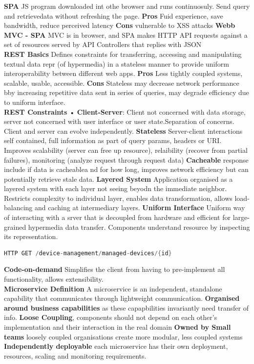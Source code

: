 \documentclass[10pt, landscape]{article}
\begin{document}
\begin{multicols}{4}
\textbf{SPA} JS program downloaded int othe browser and runs continuosuly. Send query and retrievedata without refreshing the page. \textbf{Pros} Fuid experience, save bandwidth, reduce perceived latency 
\textbf{Cons} vulnerable to XSS attacks \textbf{Webb MVC - SPA} MVC is in browser, and SPA makes HTTP API requests against a set of resources served by API Controllers that replies with JSON\\

\textbf{REST Basics} 
Defines constraints for transferring, accessing and manipulating textual data repr (of hypermedia) in a stateless manner to provide uniform interoperability between different web apps. \textbf{Pros} Less tightly coupled systems, scalable, usable, accessible. \textbf{Cons} Stateless may decrease network performance bby increasing repetitive data sent in series of queries, may degrade efficiency due to uniform interface.\\ 
\textbf{REST Constraints} 
• \textbf{Client-Server}: Client not concerned with data storage, server not concerned with user interface or user state.Separation of concerns. Client and server can evolve independently. 
\textbf{Stateless} 
Server-client interactions self contained, full information as part of query params, headers or URI. Improves scalability (server can free up resource), relaibility (recover from partial failures), monitoring (analyze request through request data)
\textbf{Cacheable}
response include if data is cacheablea nd for how long, improves network efficiency but can potentially retrieve stale data.
\textbf{Layered System}
Application organised as a layered system with each layer not seeing beyodn the immediate neighbor. Restricts complexity to individual layer, enables data transformation, allows load-balancing and caching at intermediary layers. 
\textbf{Uniform Interface}
Uniform way of interacting with a srver that is decoupled from hardware and efficient for large-grained hypermedia data transfer. Components understand resource by inspecting its representation.
\begin{lstlisting}[language=C++, breaklines=false, breakatwhitespace=false]
HTTP GET /device-management/managed-devices/{id}
\end{lstlisting}
\textbf{Code-on-demand} Simplifies the client from having to pre-implement all functionality, allows extensibility. \\
\textbf{Microservice Definition} A microservice is an independent, standalone capability that communicates through lightweight communication.
\textbf{Organised around business capabilities} as these capapbilities invariantly need transfer of info. \textbf{Loose Coupling}, components should not depend on each other's implementation and their interaction in the real domain \textbf{Owned by Small teams} loosely coupled organisations create more modular, less coupled systems \textbf{Independently deployable} each microservice has their own deployment, resources, scaling and monitoring requirements.\\


\end{multicols}
\end{document}
